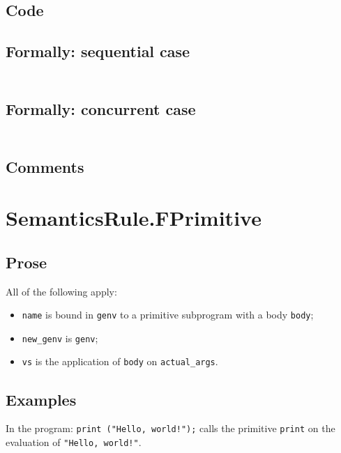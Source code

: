 \documentclass{book}
\begin{document}
  \subsection{Code}

  \subsection{Formally: sequential case}
  \begin{align}
  \end{align} 

  \subsection{Formally: concurrent case}
  \begin{align}
  \end{align} 

  \subsection{Comments}

\section{SemanticsRule.FPrimitive \label{sec:SemanticsRule.FPrimitive}}

  \subsection{Prose}
  All of the following apply:
  \begin{itemize}
  \item \texttt{name} is bound in \texttt{genv} to a primitive subprogram with a body \texttt{body};
  \item \texttt{new\_genv} is \texttt{genv};
  \item \texttt{vs} is the application of \texttt{body} on \texttt{actual\_args}.
  \end{itemize}

  \subsection{Examples}
  In the program:
  \texttt{print ("Hello, world!");} calls the primitive \texttt{print} on the evaluation of \texttt{"Hello, world!"}.
\end{document}
